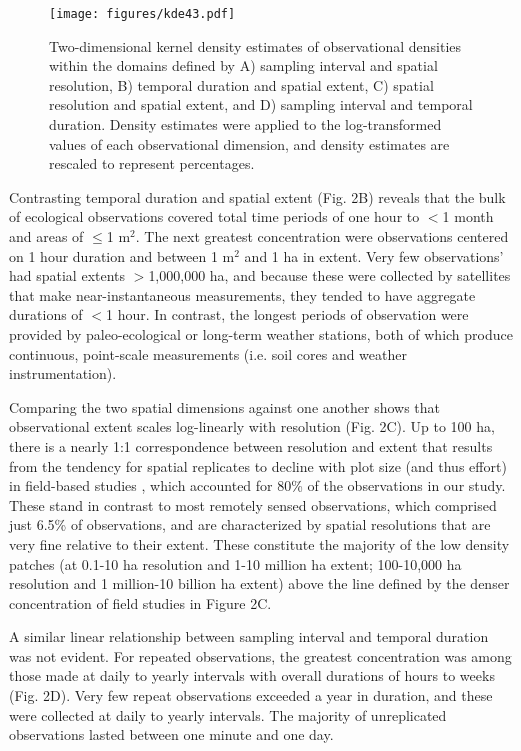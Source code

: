 \documentclass[12pt]{article}
\begin{document}
\begin{figure}[!ht]
\texttt{[image: figures/kde43.pdf]}
\vspace{-0.15 cm}
\caption{Two-dimensional kernel density estimates of observational densities within the domains defined by A) sampling interval and spatial resolution, B) temporal duration and spatial extent, C) spatial resolution and spatial extent, and D) sampling interval and temporal duration. Density estimates were applied to the log-transformed values of each observational dimension, and density estimates are rescaled to represent percentages. }
\label{afoto1}
\end{figure}

Contrasting temporal duration and spatial extent (Fig. 2B) reveals that the bulk of ecological observations covered total time periods of one hour to $<$1 month and areas of $\leq$1 m$^2$. The next greatest concentration were observations centered on 1 hour duration and between 1 m$^2$ and 1 ha in extent. Very few observations' had spatial extents $>$1,000,000 ha, and because these were collected by satellites that make near-instantaneous measurements, they tended to have aggregate durations of $<$1 hour. In contrast, the longest periods of observation were provided by paleo-ecological or long-term weather stations, both of which produce continuous, point-scale measurements (i.e. soil cores and weather instrumentation). 

Comparing the two spatial dimensions against one another shows that observational extent scales log-linearly with resolution (Fig. 2C). Up to 100 ha, there is a nearly 1:1 correspondence between resolution and extent that results from the tendency for spatial replicates to decline with plot size (and thus effort) in field-based studies \cite{kareiva_spatial_1988}, which accounted for 80\% of the observations in our study. These stand in contrast to most remotely sensed observations, which comprised just 6.5\% of observations, and are characterized by spatial resolutions that are very fine relative to their extent. These constitute the majority of the low density patches (at 0.1-10 ha resolution and 1-10 million ha extent; 100-10,000 ha resolution and 1 million-10 billion ha extent) above the line defined by the denser concentration of field studies in Figure 2C.  

A similar linear relationship between sampling interval and temporal duration was not evident. For repeated observations, the greatest concentration was among those made at daily to yearly intervals with overall durations of hours to weeks (Fig. 2D). Very few repeat observations exceeded a year in duration, and these were collected at daily to yearly intervals. The majority of unreplicated observations lasted between one minute and one day. 
\end{document}
